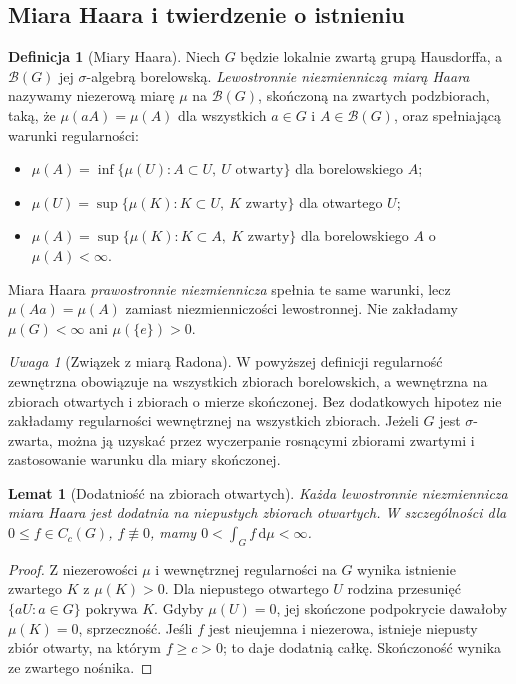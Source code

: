 \documentclass[11pt,a4paper]{article}
\numberwithin{equation}{section}
\theoremstyle{plain}
\newtheorem{lemat}[twierdzenie]{Lemat}
\theoremstyle{definition}
\newtheorem{definicja}[twierdzenie]{Definicja}
\theoremstyle{remark}
\newtheorem{uwaga}[twierdzenie]{Uwaga}
\begin{document}
\subsection*{Miara Haara i twierdzenie o istnieniu}
\begin{definicja}[Miary Haara]
Niech $G$ będzie lokalnie zwartą grupą Hausdorffa, a $\mathcal B(G)$ jej $\sigma$-algebrą borelowską. \emph{Lewostronnie niezmienniczą miarą Haara} nazywamy niezerową miarę $\mu$ na $\mathcal B(G)$, skończoną na zwartych podzbiorach, taką, że $\mu(aA)=\mu(A)$ dla wszystkich $a\in G$ i $A\in\mathcal B(G)$, oraz spełniającą warunki regularności:
\begin{itemize}
\item $\mu(A)=\inf\{\mu(U):A\subset U,\ U\text{ otwarty}\}$ dla borelowskiego $A$;
\item $\mu(U)=\sup\{\mu(K):K\subset U,\ K\text{ zwarty}\}$ dla otwartego $U$;
\item $\mu(A)=\sup\{\mu(K):K\subset A,\ K\text{ zwarty}\}$ dla borelowskiego $A$ o $\mu(A)<\infty$.
\end{itemize}
Miara Haara \emph{prawostronnie niezmiennicza} spełnia te same warunki, lecz $\mu(Aa)=\mu(A)$ zamiast niezmienniczości lewostronnej. Nie zakładamy $\mu(G)<\infty$ ani $\mu(\{e\})>0$.
\end{definicja}
\begin{uwaga}[Związek z miarą Radona]
W powyższej definicji regularność zewnętrzna obowiązuje na wszystkich zbiorach borelowskich, a wewnętrzna na zbiorach otwartych i zbiorach o mierze skończonej. Bez dodatkowych hipotez nie zakładamy regularności wewnętrznej na wszystkich zbiorach. Jeżeli $G$ jest $\sigma$-zwarta, można ją uzyskać przez wyczerpanie rosnącymi zbiorami zwartymi i zastosowanie warunku dla miary skończonej.
\end{uwaga}
\begin{lemat}[Dodatniość na zbiorach otwartych]
Każda lewostronnie niezmiennicza miara Haara jest dodatnia na niepustych zbiorach otwartych. W szczególności dla $0\le f\in C_c(G)$, $f\not\equiv0$, mamy $0<\int_G f\,\mathrm d\mu<\infty$.
\end{lemat}
\begin{proof}
Z niezerowości $\mu$ i wewnętrznej regularności na $G$ wynika istnienie zwartego $K$ z $\mu(K)>0$. Dla niepustego otwartego $U$ rodzina przesunięć $\{aU:a\in G\}$ pokrywa $K$. Gdyby $\mu(U)=0$, jej skończone podpokrycie dawałoby $\mu(K)=0$, sprzeczność. Jeśli $f$ jest nieujemna i niezerowa, istnieje niepusty zbiór otwarty, na którym $f\ge c>0$; to daje dodatnią całkę. Skończoność wynika ze zwartego nośnika.
\end{proof}
\end{document}
